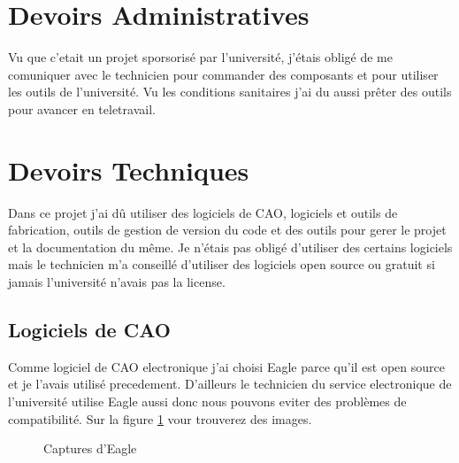 \documentclass[12pt]{article}
\begin{document}
\section{Devoirs Administratives}
Vu que c'etait un projet sporsoris\'e par l'universit\'e, j'\'etais oblig\'e de me
comuniquer avec le technicien pour commander des composants et pour utiliser les
outils de l'universit\'e. Vu les conditions sanitaires j'ai du aussi pr\^eter 
des outils pour avancer en teletravail.

\section{Devoirs Techniques}
\begin{par}
	Dans ce projet j'ai dû utiliser des logiciels de CAO,
	logiciels et outils de fabrication, outils de gestion
	de version du code et des outils pour gerer le projet
	et la documentation du même. Je n'étais pas obligé 
	d'utiliser des certains logiciels mais le technicien m'a
	conseillé d'utiliser des logiciels open source ou gratuit
	si jamais l'université n'avais pas la license.
\end{par}
\subsection{Logiciels de CAO}

\begin{par}
	Comme logiciel de CAO electronique j'ai choisi Eagle parce qu'il
	est open source et je l'avais utilisé precedement. D'ailleurs
	le technicien du service electronique de l'université utilise
	Eagle aussi donc nous pouvons eviter des problèmes de compatibilité.
	Sur la figure \ref{img:eagle_all} vour trouverez des images.
\end{par}
\begin{figure}[!htb]
	\centering
	\caption{Captures d'Eagle}
	\label{img:eagle_all}
\end{figure}
\end{document}
